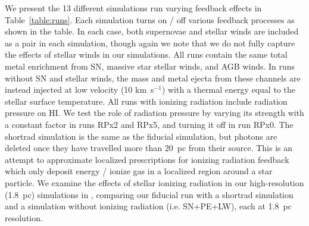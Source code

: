 \documentclass[twocolumn]{aastex62}
\newcommand{\HI}{HI}
\newcommand{\aje}[1]{\textcolor{blue}{\textbf{(AJE: #1)}}}
\begin{document}
We present the 13 different simulations run varying feedback effects in Table~\ref{table:runs}. Each simulation turns on / off various feedback processes as shown in the table. In each case, both supernovae and stellar winds are included as a pair in each simulation, though again we note that we do not fully capture the effects of stellar winds in our simulations. All runs contain the same total metal enrichment from SN, massive star stellar winds, and AGB winds. In runs without SN and stellar winds, the mass and metal ejecta from these channels are instead injected at low velocity (10 km~s$^{-1}$) with a thermal energy equal to the stellar surface temperature. All runs with ionizing radiation include radiation pressure on \HI. We test the role of radiation pressure by varying its strength with a constant factor in runs RPx2 and RPx5, and turning it off in run RPx0. The shortrad simulation is the same as the fiducial simulation, but photons are deleted once they have travelled more than 20~pc from their source. This is an attempt to approximate localized prescriptions for ionizing radiation feedback which only deposit energy / ionize gas in a localized region around a star particle. We examine the effects of stellar ionizing radiation in our high-resolution (1.8~pc) simulations in \cite{Emerick2018a}, comparing our fiducial run with a shortrad simulation and a simulation without ionizing radiation (i.e. SN+PE+LW), each at 1.8~pc resolution.

\end{document}
